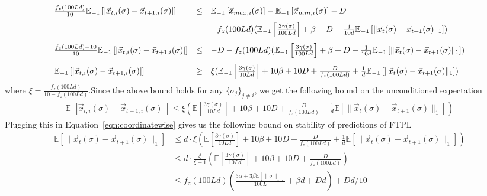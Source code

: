 \documentclass[]{article}
\newcommand{\E}[1]{\mathbb{E}\left[#1\right]}
\newcommand{\Eover}[2]{\mathbb{E}_{#1}\left[#2\right]}
\newcommand{\x}{\vec{x}}
\newcommand{\norm}[1]{\|{#1} \|}
\theoremstyle{definition}
\begin{document}
\begin{equation*}
    \begin{array}{lll}
    \frac{f_z(100Ld)}{10} \Eover{-1}{|\x_{t,i}(\sigma) - \x_{t+1,i}(\sigma)|} &\leq&  \Eover{-1}{\x_{max, i}(\sigma)} - \Eover{-1}{\x_{min, i}(\sigma)}  - D \vspace{0.1in}\\
    && - f_z(100Ld)( \Eover{-1}{\frac{3\gamma(\sigma)}{100Ld}} + \beta + D + \frac{1}{10d}\Eover{-1}{\|\x_{t}(\sigma) - \x_{t+1}(\sigma)\|_1}) \vspace{0.1in}\\
    
    \frac{f_z(100Ld) - 10}{10} \Eover{-1}{|\x_{t,i}(\sigma) - \x_{t+1,i}(\sigma)|} &\leq& - D - f_z(100Ld)( \Eover{-1}{\frac{3\gamma(\sigma)}{100Ld}} + \beta + D + \frac{1}{10d}\Eover{-1}{\|\x_{t}(\sigma) - \x_{t+1}(\sigma)\|_1}) \vspace{0.1in}\\

    \Eover{-1}{|\x_{t,i}(\sigma) - \x_{t+1,i}(\sigma)|} &\geq& \xi ( \Eover{-1}{\frac{3\gamma(\sigma)}{10Ld}} + 10\beta + 10D + \frac{D}{f_z(100Ld)} + \frac{1}{d}\Eover{-1}{\|\x_{t}(\sigma) - \x_{t+1}(\sigma)\|_1}) \\
\end{array}
\end{equation*}
where $\xi = \frac{f_z(100Ld)}{10 - f_z(100Ld)}$.Since the above bound holds for any $\{\sigma_j\}_{j\neq i}$, we get the following bound on the unconditioned expectation
\begin{align*}
\E{|\x_{t,i}(\sigma) - \x_{t+1,i}(\sigma)|}  \leq \xi ( \E{\frac{3\gamma(\sigma)}{10Ld}} + 10\beta + 10D + \frac{D}{f_z(100Ld)} + \frac{1}{d}\E{\|\x_{t}(\sigma) - \x_{t+1}(\sigma)\|_1})
\end{align*}
Plugging this in Equation~\eqref{eqn:coordinatewise} gives us the following bound on stability of predictions of FTPL
\begin{align*}
\E{\norm{\x_{t}(\sigma) - \x_{t+1}(\sigma)}_1} & \leq  d \cdot \xi ( \E{\frac{3\gamma(\sigma)}{10Ld}} + 10\beta + 10D + \frac{D}{f_z(100Ld)} + \frac{1}{d}\E{\|\x_{t}(\sigma) - \x_{t+1}(\sigma)\|_1})\\
& \leq d \cdot \frac{\xi}{\xi + 1} ( \E{\frac{3\gamma(\sigma)}{10Ld}} + 10\beta + 10D + \frac{D}{f_z(100Ld)})\\
& \leq f_z(100Ld)( \frac{3\alpha + 3\beta\E{\norm{\sigma}_1} }{100L} + \beta d + Dd) + Dd/10
\end{align*}
\end{document}
